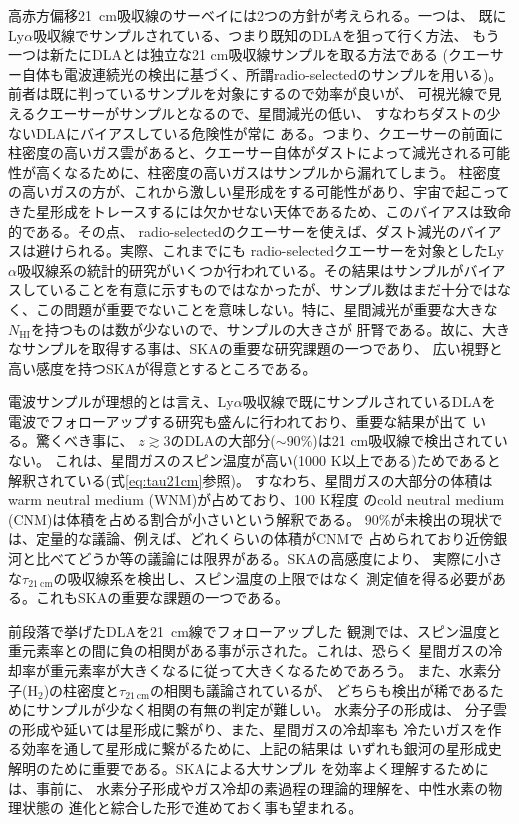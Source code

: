 高赤方偏移21~cm吸収線のサーベイには2つの方針が考えられる。一つは、
既にLy$\alpha$吸収線でサンプルされている、つまり既知のDLAを狙って行く方法、
もう一つは新たにDLAとは独立な21 cm吸収線サンプルを取る方法である
(クエーサー自体も電波連続光の検出に基づく、所謂radio-selectedのサンプルを用いる)。
前者は既に判っているサンプルを対象にするので効率が良いが、
可視光線で見えるクエーサーがサンプルとなるので、星間減光の低い、
すなわちダストの少ないDLAにバイアスしている危険性が常に
ある。つまり、クエーサーの前面に柱密度の高いガス雲があると、クエーサー自体がダストによって減光される可能性が高くなるために、柱密度の高いガスはサンプルから漏れてしまう\citep{2005A&A...444..461V}。
柱密度の高いガスの方が、これから激しい星形成をする可能性があり、宇宙で起こってきた星形成をトレースするには欠かせない天体であるため、このバイアスは致命的である。その点、
radio-selectedのクエーサーを使えば、ダスト減光のバイアスは避けられる。実際、これまでにも
radio-selectedクエーサーを対象としたLy$\alpha$吸収線系の統計的研究がいくつか行われている\citep{2005A&A...440..499A,2005AJ....130.1345E}。その結果はサンプルがバイアスしていることを有意に示すものではなかったが、サンプル数はまだ十分ではなく、この問題が重要でないことを意味しない。特に、星間減光が重要な大きな$N_\mathrm{HI}$を持つものは数が少ないので、サンプルの大きさが
肝腎である。故に、大きなサンプルを取得する事は、SKAの重要な研究課題の一つであり、
広い視野と高い感度を持つSKAが得意とするところである。

電波サンプルが理想的とは言え、Ly$\alpha$吸収線で既にサンプルされているDLAを
電波でフォローアップする研究も盛んに行われており、重要な結果が出て
いる\citep{2012MNRAS.421..651S,2014MNRAS.438.2131K}。驚くべき事に、
$z\gtrsim 3$のDLAの大部分($\sim 90$\%)は21 cm吸収線で検出されていない。
これは、星間ガスのスピン温度が高い(1000 K以上である)ためであると
解釈されている(式\ref{eq:tau21cm}参照)。
すなわち、星間ガスの大部分の体積はwarm neutral medium (WNM)が占めており、100 K程度
のcold neutral medium (CNM)は体積を占める割合が小さいという解釈である。
90\%が未検出の現状では、定量的な議論、例えば、どれくらいの体積がCNMで
占められており近傍銀河と比べてどうか等の議論には限界がある。SKAの高感度により、
実際に小さな$\tau_\mathrm{21~cm}$の吸収線系を検出し、スピン温度の上限ではなく
測定値を得る必要がある。これもSKAの重要な課題の一つである。

前段落で挙げたDLAを21~cm線でフォローアップした
観測\citep{2012MNRAS.421..651S,2014MNRAS.438.2131K}では、スピン温度と
重元素率との間に負の相関がある事が示された。これは、恐らく
星間ガスの冷却率が重元素率が大きくなるに従って大きくなるためであろう。
また、水素分子(H$_2$)の柱密度と$\tau_\mathrm{21\,cm}$の相関も議論されているが、
どちらも検出が稀であるためにサンプルが少なく相関の有無の判定が難しい。
水素分子の形成は、
分子雲の形成や延いては星形成に繋がり、また、星間ガスの冷却率も
冷たいガスを作る効率を通して星形成に繋がるために、上記の結果は
いずれも銀河の星形成史解明のために重要である。SKAによる大サンプル
を効率よく理解するためには、事前に、
水素分子形成やガス冷却の素過程の理論的理解を、中性水素の物理状態の
進化と綜合した形で進めておく事も望まれる。
